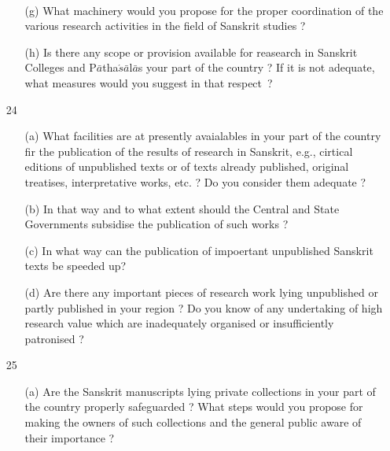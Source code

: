 {\rm 
\begin{itemize} 
\item[~]\begin{itemize}
\item[(g)] What machinery would you propose for the proper coordination of the various research activities in the field of Sanskrit studies ?
              
              \item[(h)] Is there any scope or provision available for reasearch in Sanskrit Colleges and P$\bar{a}$tha$\acute{s}\bar{a}$l$\bar{a}$s your part of the country ? If it is not adequate, what measures would you suggest in that respect~?
              \end{itemize}

\item[24] \begin{itemize}
          
          \item[(a)] What facilities are at presently avaialables in your part of the country fir the publication of the results of research in Sanskrit, e.g., cirtical editions of unpublished texts or of texts already published, original treatises, interpretative works, etc. ? Do you consider them adequate ?
          
          \item[(b)] In that way and to what extent should the Central and State Governments subsidise the publication of such works ?
          
          \item[(c)] In what way can the publication of impoertant unpublished Sanskrit texts be speeded up?
          
          \item[(d)] Are there any important pieces of research work lying unpublished or partly published in your region ? Do you know of any undertaking of high research value which are inadequately organised or insufficiently patronised ?
           \end{itemize} 

\item[25] \begin{itemize}
           
           \item[(a)] Are the Sanskrit manuscripts lying private collections in your part of the country properly safeguarded ? What steps would you propose for making the owners of such collections and the general public aware of their importance ?
           

\end{itemize}
\end{itemize}}
